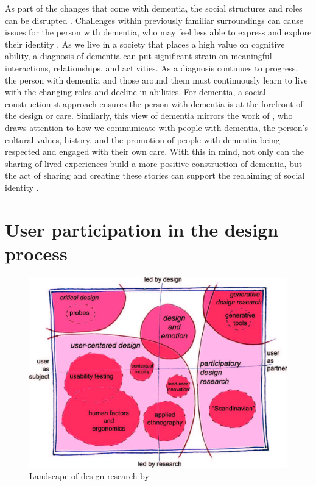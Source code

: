 As part of the changes that come with dementia, the social structures and roles can be disrupted \citep{hampson_dementia:_2016}. Challenges within previously familiar surroundings can cause issues for the person with dementia, who may feel less able to express and explore their identity \citep{john_killick_claire_craig_creativity_2012}. As we live in a society that places a high value on cognitive ability, a diagnosis of dementia can put significant strain on meaningful interactions, relationships, and activities. As a diagnosis continues to progress, the person with dementia and those around them must continuously learn to live with the changing roles and decline in abilities. For dementia, a social constructionist approach ensures the person with dementia is at the forefront of the design or care. Similarly, this view of dementia mirrors the work of \cite{kitwood1997dementia}, who draws attention to how we communicate with people with dementia, the person's cultural values, history, and the promotion of people with dementia being respected and engaged with their own care. With this in mind, not only can the sharing of lived experiences build a more positive construction of dementia, but the act of sharing and creating these stories can support the reclaiming of social identity \citep{ryan_dementia_2009}.

\section{User participation in the design process}
\label{ParticipationDesignProcess}

\begin{figure}[htp]
    \centering
    \includegraphics[width=0.6\linewidth]{Images/Methodology/Landscape_of_Design.jpg}
    \caption{Landscape of design research by  \citep{sanders2008co}}
    \label{fig:LandscapeOfDesign}
\end{figure}

